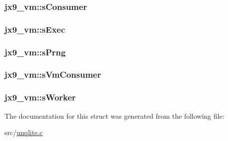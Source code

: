 \hypertarget{structjx9__vm_a71bda441e53827df781cb6e573682cc3}{
\subsubsection[{s\-Consumer}]{ jx9\-\_\-vm\-::s\-Consumer}}\label{d1/d16/structjx9__vm_a71bda441e53827df781cb6e573682cc3}
\hypertarget{structjx9__vm_a23338c5736957522f22b3c6f6ae423bd}{
\subsubsection[{s\-Exec}]{ jx9\-\_\-vm\-::s\-Exec}}\label{d1/d16/structjx9__vm_a23338c5736957522f22b3c6f6ae423bd}
\hypertarget{structjx9__vm_a95174c79b9b1017dc4a59512b90180d8}{
\subsubsection[{s\-Prng}]{ jx9\-\_\-vm\-::s\-Prng}}\label{d1/d16/structjx9__vm_a95174c79b9b1017dc4a59512b90180d8}
\hypertarget{structjx9__vm_aadebd05ff60669500cb4068036b55251}{
\subsubsection[{s\-Vm\-Consumer}]{ jx9\-\_\-vm\-::s\-Vm\-Consumer}}\label{d1/d16/structjx9__vm_aadebd05ff60669500cb4068036b55251}
\hypertarget{structjx9__vm_a8a4256f53aa19fa8aa84ec7fab4f4b7d}{
\subsubsection[{s\-Worker}]{ jx9\-\_\-vm\-::s\-Worker}}\label{d1/d16/structjx9__vm_a8a4256f53aa19fa8aa84ec7fab4f4b7d}


The documentation for this struct was generated from the following file\-:\begin{DoxyCompactItemize}
\item 
src/\hyperlink{unqlite_8c}{unqlite.\-c}\end{DoxyCompactItemize}
